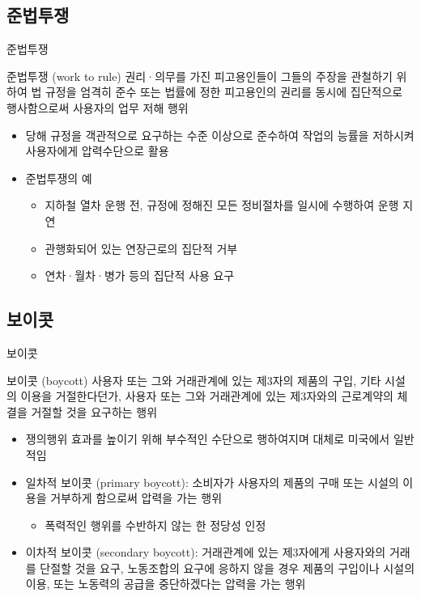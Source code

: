 \documentclass[aspectratio=169,xcolor=dvipsnames,handout]{beamer}
\begin{document}
\subsection{준법투쟁}
\begin{frame}{준법투쟁}
    \begin{block}{준법투쟁 (work to rule)}
        권리·의무를 가진 피고용인들이 그들의 주장을 관철하기 위하여 법 규정을 엄격히 준수 또는 법률에 정한 피고용인의 권리를 동시에 집단적으로 행사함으로써 사용자의 업무 저해 행위
    \end{block}
    \begin{itemize}[<+->]
        \item 당해 규정을 객관적으로 요구하는 수준 이상으로 준수하여 작업의 능률을 저하시켜 사용자에게 압력수단으로 활용
        \item 준법투쟁의 예
        \begin{itemize}[<+->]
            \item 지하철 열차 운행 전, 규정에 정해진 모든 정비절차를 일시에 수행하여 운행 지연
            \item 관행화되어 있는 연장근로의 집단적 거부
            \item 연차·월차·병가 등의 집단적 사용 요구
        \end{itemize}
    \end{itemize}
\end{frame}

\subsection{보이콧}
\begin{frame}[allowframebreaks]{보이콧}
    \begin{block}{보이콧 (boycott)} 
        사용자 또는 그와 거래관계에 있는 제3자의 제품의 구입, 기타 시설의 이용을 거절한다던가, 사용자 또는 그와 거래관계에 있는 제3자와의 근로계약의 체결을 거절할 것을 요구하는 행위
    \end{block}
    \begin{itemize}[<+->]
        \item 쟁의행위 효과를 높이기 위해 부수적인 수단으로 행하여지며 대체로 미국에서 일반적임
    \end{itemize}
    \framebreak\relax
    \begin{itemize}[<+->]
        \item 일차적 보이콧 (primary boycott): 소비자가 사용자의 제품의 구매 또는 시설의 이용을 거부하게 함으로써 압력을 가는 행위 
        \begin{itemize}[<+->]
            \item 폭력적인 행위를 수반하지 않는 한 정당성 인정
        \end{itemize}
    \item 이차적 보이콧 (secondary boycott): 거래관계에 있는 제3자에게 사용자와의 거래를 단절할 것을 요구, 노동조합의 요구에 응하지 않을 경우 제품의 구입이나 시설의 이용, 또는 노동력의 공급을 중단하겠다는 압력을 가는 행위 
    \end{itemize}
\end{frame}
\end{document}
